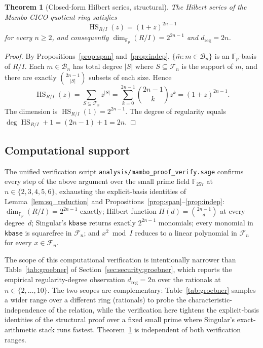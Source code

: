 \documentclass[11pt,a4paper]{article}
\newtheorem{theorem}{Theorem}[section]
\theoremstyle{definition}
\newcommand{\F}{\mathbb{F}}
\begin{document}
\begin{theorem}[Closed-form Hilbert series, structural]\label{thm:hilb_closed}
The Hilbert series of the Mambo CICO quotient ring satisfies
\[
\operatorname{HS}_{R/I}(z) = (1 + z)^{2n - 1}
\]
for every $n \ge 2$, and consequently
$\dim_{\F_p}(R/I) = 2^{2n - 1}$ and $d_{\mathrm{reg}} = 2n$.
\end{theorem}

\begin{proof}
By Propositions~\ref{prop:span} and~\ref{prop:indep},
$\{\bar m : m \in \mathcal{B}_n\}$ is an $\F_p$-basis of $R/I$. Each
$m \in \mathcal{B}_n$ has total degree $|S|$ where $S \subseteq
\mathcal{F}_n$ is the support of $m$, and there are exactly
$\binom{2n - 1}{|S|}$ subsets of each size. Hence
\[
\operatorname{HS}_{R/I}(z) = \sum_{S \subseteq \mathcal{F}_n} z^{|S|}
= \sum_{k=0}^{2n-1} \binom{2n-1}{k} z^k = (1 + z)^{2n - 1}.
\]
The dimension is $\operatorname{HS}_{R/I}(1) = 2^{2n-1}$. The degree
of regularity equals $\deg \operatorname{HS}_{R/I} + 1 = (2n-1) + 1 = 2n$.
\end{proof}

\subsection{Computational support}\label{app:dreg:computational}

The unified verification script
\texttt{analysis/mambo\_proof\_verify.sage} confirms every step of the
above argument over the small prime field $\F_{257}$ at
$n \in \{2, 3, 4, 5, 6\}$, exhausting the explicit-basis identities
of Lemma~\ref{lem:sq_reduction} and
Propositions~\ref{prop:span}--\ref{prop:indep}:
$\dim_{\F_p}(R/I) = 2^{2n-1}$ exactly; Hilbert function
$H(d) = \binom{2n-1}{d}$ at every degree~$d$; Singular's
\texttt{kbase} returns exactly $2^{2n-1}$ monomials; every monomial
in \texttt{kbase} is squarefree in $\mathcal{F}_n$; and $x^2 \bmod I$
reduces to a linear polynomial in $\mathcal{F}_n$ for every
$x \in \mathcal{F}_n$.

The scope of this computational verification is intentionally narrower
than Table~\ref{tab:groebner} of Section~\ref{sec:security:groebner},
which reports the empirical regularity-degree observation
$d_{\mathrm{reg}} = 2n$ over the rationals at $n \in \{2, \ldots, 10\}$.
The two scopes are complementary: Table~\ref{tab:groebner} samples a
wider range over a different ring (rationals) to probe the
characteristic-independence of the relation, while the verification
here tightens the explicit-basis identities of the structural proof
over a fixed small prime where Singular's exact-arithmetic stack runs
fastest. Theorem~\ref{thm:hilb_closed} is independent of both
verification ranges.
\end{document}
